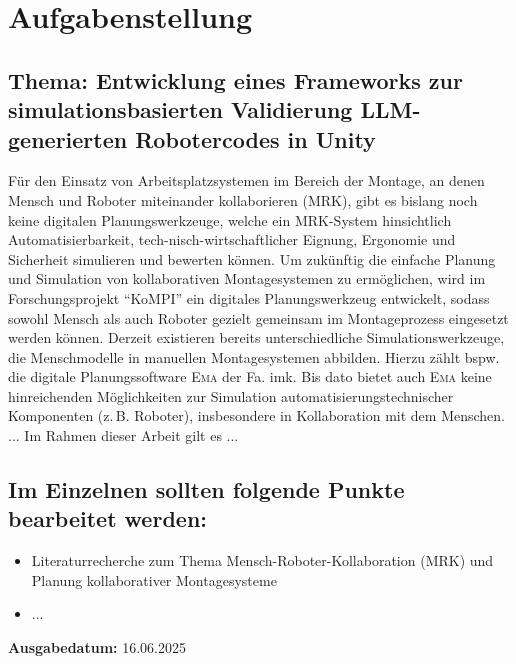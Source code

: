 \chapter*{Aufgabenstellung}
\label{cap:Aufgabenstellung}


\section*{Thema: Entwicklung eines Frameworks zur simulationsbasierten Validierung LLM-generierten Robotercodes in Unity}
\label{sec:Thema: Entwicklung eines Frameworks zur simulationsbasierten Validierung LLM-generierten Robotercodes in Unity}
\noindent
Für den Einsatz von Arbeitsplatzsystemen im Bereich der Montage, an denen Mensch und Roboter miteinander kollaborieren (MRK), gibt es bislang noch keine digitalen Planungswerkzeuge, welche ein MRK-System hinsichtlich Automatisierbarkeit, tech-nisch-wirtschaftlicher Eignung, Ergonomie und Sicherheit simulieren und bewerten können.
Um zukünftig die einfache Planung und Simulation von kollaborativen Montagesystemen zu ermöglichen, wird im Forschungsprojekt "`KoMPI"' ein digitales Planungswerkzeug entwickelt, sodass sowohl Mensch als auch Roboter gezielt gemeinsam im Montageprozess eingesetzt werden können.
Derzeit existieren bereits unterschiedliche Simulationswerkzeuge, die Menschmodelle in manuellen Montagesystemen abbilden.
Hierzu zählt bspw. die digitale Planungssoftware \textsc{Ema} der Fa. imk.
Bis dato bietet auch \textsc{Ema} keine hinreichenden Möglichkeiten zur Simulation automatisierungstechnischer Komponenten (z.\,B. Roboter), insbesondere in Kollaboration mit dem Menschen.
...
Im Rahmen dieser Arbeit gilt es ...


\section*{Im Einzelnen sollten folgende Punkte bearbeitet werden:}
\label{sec:Im Einzelnen sollten folgende Punkte bearbeitet werden:}
\noindent
\begin{itemize}
	\item Literaturrecherche zum Thema Mensch-Roboter-Kollaboration (MRK) und Planung kollaborativer Montagesysteme
	\item ...
\end{itemize}

\noindent
\textbf{Ausgabedatum:} 16.06.2025

